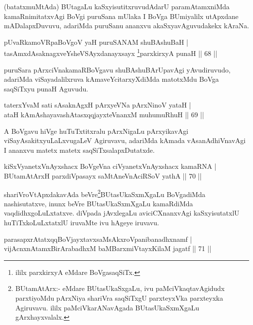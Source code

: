 \begin{artha}
(batatxmuMtAda) BUtagaLu kaSxyisutitxruvudAdarU paramAtamxniMda kamaRnimitatxvAgi BoVgi puruSana mUlaka I BoVga BUmiyalilx utApxdane mADalapxDuvuvu, adariMda puruSanu ananxvu akaSxyavAguvudakekx kAraNa.
\end{artha}

\begin{shl}
pUvaRkamoVRpaBoVgoV yaH puruSANAM shuBAshuBaH |\\
tasAmxdAsaknagxveYsheVSAyxdanayxsayx \footnote{ililx parxkirxyA eMdare BoVgasaqSiTx.}parxkirxyA punaH \hfill || 68 ||
\end{shl}

\begin{artha}
puruSara pArxciVnakamaRBoVgavu shuBAshuBArUpavAgi yAvudiruvudo, adariMda viSayadalilxruva kAmaveYcitarxyXdiMda matotxMdu BoVga saqSiTxyu punaH Aguvudu.
\end{artha}

\begin{shl}
taterxYvaM sati sAsaknAgxH pArxyeVNa pArxNinoV yataH |\\
ataH kAmAshayavashAtasxqqjayxteV\s nanxM muhumuRhuH \hfill || 69 ||
\end{shl}

\begin{artha}
A BoVgavu hiVge huTuTxtitxralu pArxNigaLu pArxyikavAgi viSayAsakitxyuLaLxvugaLeV Agiruvavu, adariMda kAmada vAsanAdhiVnavAgi I ananxvu matetx matetx saqSiTxsalapxDutatxde.
\end{artha}

\begin{shl}
kiSxVyanetxV\s nAyxshacx BoVgeVna ciVyanetxV\s nAyxshacx kamaRNA |\\
BUtamAtArxH parxdiVpasayx saMtAneVnAciRSoV yathA \hfill || 70 ||
\end{shl}

\begin{artha}
shariVroVtApxdakavAda beVre\footnote{BUtamAtArx:- eMdare BUtasUkaSxgaLu, ivu paMciVkaqtavAgidudx parxtiyoMdu pArxNiya shariVra saqSiTxgU parxteyxVka parxteyxka Agiruvavu. ililx  paMciVkarANavAgada BUtasUkaSxmXgaLu gArxhayxvalalx.}BUtasUkaSxmXgaLu BoVgadiMda nashisutatxve, inunx beVre BUtasUkaSxmXgaLu kamaRdiMda vaqdidhxgoLuLxtatxve. diVpada jAvxlegaLu aviciCXnanxvAgi kaSxyisutatxlU huTiTxkoLuLxtatxlU iruvaMte ivu hAgeye iruvavu.
\end{artha}

\begin{shl}
parasapxrAtatxqqBoVjayxtavxsaMsAkxroVpanibanadhxnamf |\\
vijAcnxnAtamxBirArabadhxM baMBarxmiVtayxKilaM jagatf \hfill || 71 ||
\end{shl}

